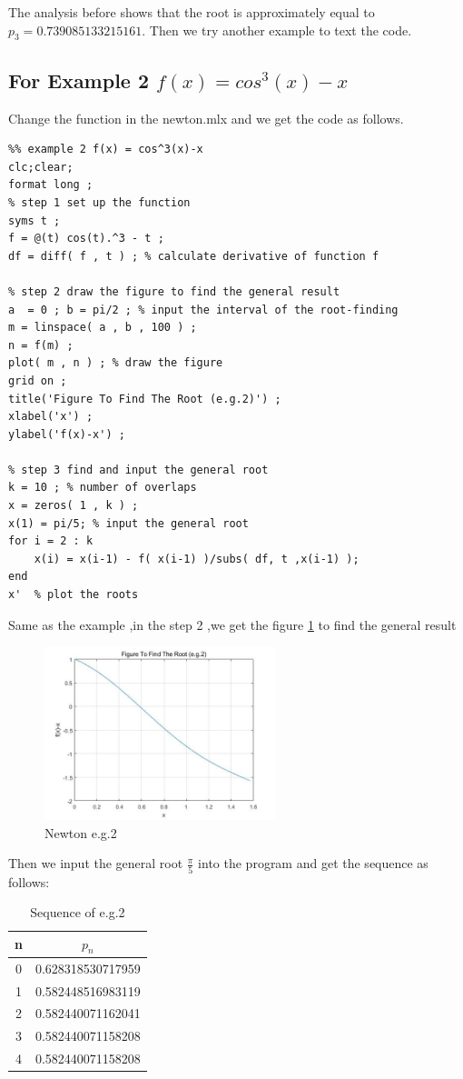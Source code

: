 \documentclass{article}
\begin{document}
The analysis before shows that the root is approximately equal to $p_3=0.739085133215161$.
Then we try another example to text the code.


\subsection{For Example 2 $f(x) = cos^3(x)-x$}
Change the function in the newton.mlx and we get the code as follows.


\begin{lstlisting}
%% example 2 f(x) = cos^3(x)-x
clc;clear;
format long ;
% step 1 set up the function
syms t ;
f = @(t) cos(t).^3 - t ;
df = diff( f , t ) ; % calculate derivative of function f

% step 2 draw the figure to find the general result
a  = 0 ; b = pi/2 ; % input the interval of the root-finding 
m = linspace( a , b , 100 ) ; 
n = f(m) ;
plot( m , n ) ; % draw the figure
grid on ;
title('Figure To Find The Root (e.g.2)') ;
xlabel('x') ; 
ylabel('f(x)-x') ;

% step 3 find and input the general root
k = 10 ; % number of overlaps
x = zeros( 1 , k ) ;
x(1) = pi/5; % input the general root
for i = 2 : k
    x(i) = x(i-1) - f( x(i-1) )/subs( df, t ,x(i-1) );
end
x'  % plot the roots
\end{lstlisting}

Same as the example ,in the step 2 ,we get the figure \ref{newton2} to find the general result

\begin{figure}[h!]
\centering
\includegraphics[width=0.6\textwidth]{newton2.jpg}
\caption{Newton e.g.2}
\label{newton2}
\end{figure}

Then we input the general root $\frac{\pi}{5}$ into the program and get the sequence as follows:


\begin{table}[h!]
\centering
\begin{center}
 \begin{tabular}{c c} 
 \hline
 \hline
n & $p_n$ \\\hline
0 & 0.628318530717959\\ \hline
1 & 0.582448516983119\\ \hline
2 & 0.582440071162041\\ \hline
3 & 0.582440071158208\\ \hline
4 & 0.582440071158208\\ 
\hline
\hline
\end{tabular}
\end{center}
\caption{Sequence of e.g.2}
\end{table}
\end{document}

